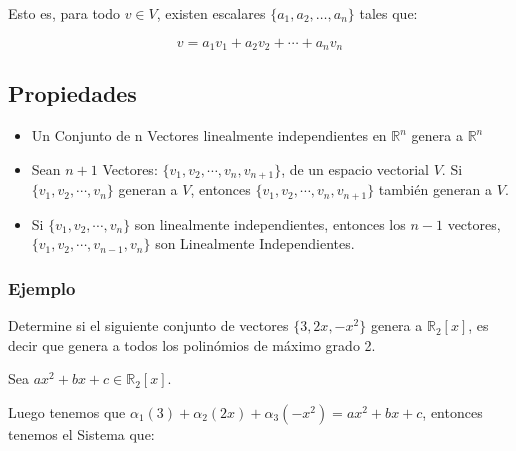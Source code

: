 \documentclass[12pt]{report}                                %
\begin{document}
        Esto es, para todo $v \in V$, existen escalares $\{a_1,a_2,\dots,a_n\}$ tales que:

        \begin{equation}
            v = a_1v_1 + a_2v_2 + \cdots + a_nv_n
        \end{equation}


        \subsection{Propiedades}
        \begin{itemize}
            \item Un Conjunto de n Vectores linealmente independientes en
            $\mathbb{R}^n$ genera a $\mathbb{R}^n$

            \item Sean $n+1$ Vectores: $\{ v_1, v_2, \cdots, v_n, v_{n+1} \}$, 
            de un espacio vectorial $V$. Si $\{ v_1, v_2, \cdots, v_n \}$ generan a $V$,
            entonces $\{ v_1, v_2, \cdots, v_n, v_{n+1} \}$ también generan a $V$.

            \item Si $\{ v_1, v_2, \cdots, v_n \}$ son linealmente independientes,
            entonces los $n-1$ vectores, $\{v_1, v_2, \cdots, v_{n-1}, v_n \}$ son
            Linealmente Independientes.

        \end{itemize}


            \subsubsection{Ejemplo}
            Determine si el siguiente conjunto de vectores $\{ 3, 2x, -x^2\}$ genera
            a $\mathbb{R}_2 [x]$, es decir que genera a todos los
            polinómios de máximo grado 2.

            Sea $ax^2 + bx +c \in \mathbb{R}_2 [x]$.

            Luego tenemos que
            $\alpha_1 (3) + \alpha_2 (2x) + \alpha_3 (-x^2) = ax^2 + bx +c$,
            entonces tenemos el Sistema que:
\end{document}
